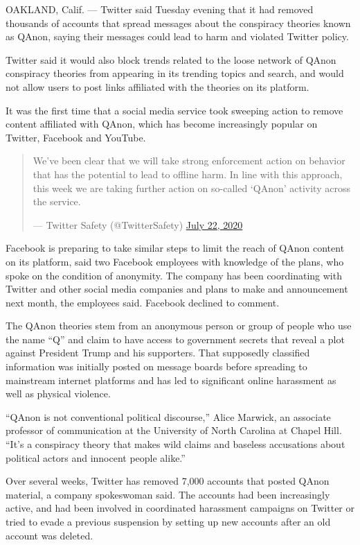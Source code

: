 OAKLAND, Calif. --- Twitter said Tuesday evening that it had removed
thousands of accounts that spread messages about the conspiracy theories
known as QAnon, saying their messages could lead to harm and violated
Twitter policy.

Twitter said it would also block trends related to the loose network of
QAnon conspiracy theories from appearing in its trending topics and
search, and would not allow users to post links affiliated with the
theories on its platform.

It was the first time that a social media service took sweeping action
to remove content affiliated with QAnon, which has become increasingly
popular on Twitter, Facebook and YouTube.

\begin{quote}
We've been clear that we will take strong enforcement action on behavior
that has the potential to lead to offline harm. In line with this
approach, this week we are taking further action on so-called `QAnon'
activity across the service.

--- Twitter Safety (@TwitterSafety)
\href{https://twitter.com/TwitterSafety/status/1285726277719199746?ref_src=twsrc\%5Etfw}{July
22, 2020}
\end{quote}

Facebook is preparing to take similar steps to limit the reach of QAnon
content on its platform, said two Facebook employees with knowledge of
the plans, who spoke on the condition of anonymity. The company has been
coordinating with Twitter and other social media companies and plans to
make and announcement next month, the employees said. Facebook declined
to comment.

The QAnon theories stem from an anonymous person or group of people who
use the name ``Q'' and claim to have access to government secrets that
reveal a plot against President Trump and his supporters. That
supposedly classified information was initially posted on message boards
before spreading to mainstream internet platforms and has led to
significant online harassment as well as physical violence.

``QAnon is not conventional political discourse,'' Alice Marwick, an
associate professor of communication at the University of North Carolina
at Chapel Hill. ``It's a conspiracy theory that makes wild claims and
baseless accusations about political actors and innocent people alike.''

Over several weeks, Twitter has removed 7,000 accounts that posted QAnon
material, a company spokeswoman said. The accounts had been increasingly
active, and had been involved in coordinated harassment campaigns on
Twitter or tried to evade a previous suspension by setting up new
accounts after an old account was deleted.

